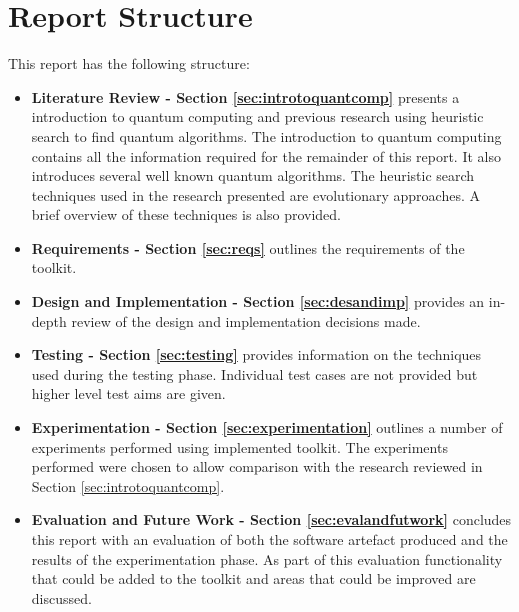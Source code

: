 \section{Report Structure}
This report has the following structure:
\begin{itemize}
 \item \textbf{Literature Review - Section \ref{sec:introtoquantcomp}} presents a introduction to quantum computing and previous research using heuristic search to find quantum algorithms.
The introduction to quantum computing contains all the information required for the remainder of this report.
It also introduces several well known quantum algorithms.
The heuristic search techniques used in the research presented are evolutionary approaches.
A brief overview of these techniques is also provided.
 \item \textbf{Requirements - Section \ref{sec:reqs}} outlines the requirements of the toolkit.
 \item \textbf{Design and Implementation - Section \ref{sec:desandimp}} provides an in-depth review of the design and implementation decisions made.
 \item \textbf{Testing - Section \ref{sec:testing}} provides information on the techniques used during the testing phase.
Individual test cases are not provided but higher level test aims are given.
 \item \textbf{Experimentation - Section \ref{sec:experimentation}} outlines a number of experiments performed using implemented toolkit.
The experiments performed were chosen to allow comparison with the research reviewed in Section \ref{sec:introtoquantcomp}.
 \item \textbf{Evaluation and Future Work - Section \ref{sec:evalandfutwork}} concludes this report with an evaluation of both the software artefact produced and the results of the experimentation phase.
As part of this evaluation functionality that could be added to the toolkit and areas that could be improved are discussed.
\end{itemize}




